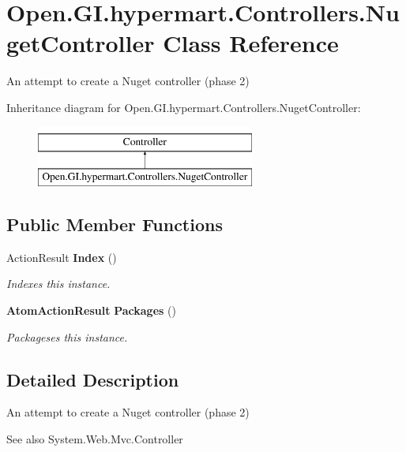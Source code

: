 \section{Open.\+G\+I.\+hypermart.\+Controllers.\+Nuget\+Controller Class Reference}
\label{class_open_1_1_g_i_1_1hypermart_1_1_controllers_1_1_nuget_controller}


An attempt to create a Nuget controller (phase 2)  


Inheritance diagram for Open.\+G\+I.\+hypermart.\+Controllers.\+Nuget\+Controller\+:\begin{figure}[H]
\begin{center}
\leavevmode
\includegraphics[height=2.000000cm]{class_open_1_1_g_i_1_1hypermart_1_1_controllers_1_1_nuget_controller}
\end{center}
\end{figure}
\subsection*{Public Member Functions}
\begin{DoxyCompactItemize}
\item 
Action\+Result \textbf{ Index} ()
\begin{DoxyCompactList}\small\item\em Indexes this instance. \end{DoxyCompactList}\item 
\textbf{ Atom\+Action\+Result} \textbf{ Packages} ()
\begin{DoxyCompactList}\small\item\em Packageses this instance. \end{DoxyCompactList}\end{DoxyCompactItemize}


\subsection{Detailed Description}
An attempt to create a Nuget controller (phase 2) 

\begin{DoxySeeAlso}{See also}
System.\+Web.\+Mvc.\+Controller


\end{DoxySeeAlso}


